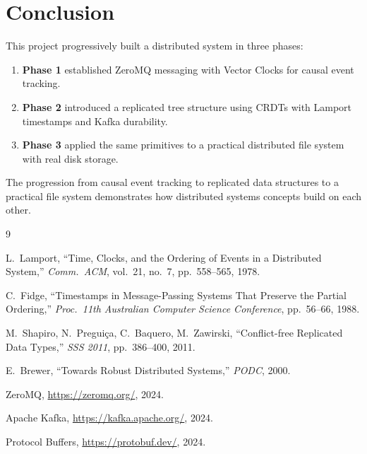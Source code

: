 \documentclass[12pt, a4paper]{article}
\begin{document}
\section{Conclusion}

This project progressively built a distributed system in three phases:

\begin{enumerate}
    \item \textbf{Phase 1} established ZeroMQ messaging with Vector Clocks for causal event tracking.
    \item \textbf{Phase 2} introduced a replicated tree structure using CRDTs with Lamport timestamps and Kafka durability.
    \item \textbf{Phase 3} applied the same primitives to a practical distributed file system with real disk storage.
\end{enumerate}

The progression from causal event tracking to replicated data structures to a practical file system demonstrates how distributed systems concepts build on each other.

\newpage
\begin{thebibliography}{9}

    L.~Lamport,
    ``Time, Clocks, and the Ordering of Events in a Distributed System,''
    \textit{Comm.\ ACM}, vol.~21, no.~7, pp.~558--565, 1978.

    C.~Fidge,
    ``Timestamps in Message-Passing Systems That Preserve the Partial Ordering,''
    \textit{Proc.\ 11th Australian Computer Science Conference}, pp.~56--66, 1988.

    M.~Shapiro, N.~Pregui\c{c}a, C.~Baquero, M.~Zawirski,
    ``Conflict-free Replicated Data Types,''
    \textit{SSS 2011}, pp.~386--400, 2011.

    E.~Brewer,
    ``Towards Robust Distributed Systems,''
    \textit{PODC}, 2000.

    ZeroMQ, \url{https://zeromq.org/}, 2024.

    Apache Kafka, \url{https://kafka.apache.org/}, 2024.

    Protocol Buffers, \url{https://protobuf.dev/}, 2024.

\end{thebibliography}
\end{document}
